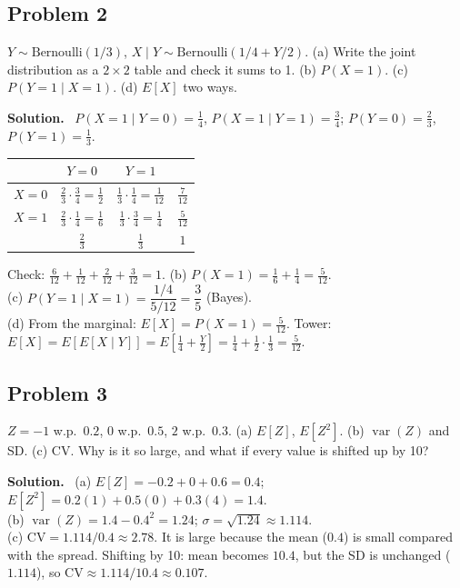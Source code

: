 \documentclass[11pt]{article}
\newcommand{\Bern}{\text{Bernoulli}}
\newenvironment{soln}{\par\smallskip\noindent\textbf{Solution.}\ }{\par\medskip}
\begin{document}
\subsection*{Problem 2}
$Y\sim\Bern(1/3)$, $X\mid Y\sim\Bern(1/4+Y/2)$. (a) Write the joint distribution as a $2\times2$ table and check it sums to 1. (b) $P(X{=}1)$. (c) $P(Y{=}1\mid X{=}1)$. (d) $E[X]$ two ways.
\begin{soln}
$P(X{=}1\mid Y{=}0)=\frac14$, $P(X{=}1\mid Y{=}1)=\frac34$; $P(Y{=}0)=\frac23$, $P(Y{=}1)=\frac13$.
\begin{center}
\begin{tabular}{c|cc|c}
 & $Y=0$ & $Y=1$ &\\\hline
$X=0$ & $\frac23\cdot\frac34=\frac12$ & $\frac13\cdot\frac14=\frac1{12}$ & $\frac7{12}$\\
$X=1$ & $\frac23\cdot\frac14=\frac16$ & $\frac13\cdot\frac34=\frac14$ & $\frac5{12}$\\\hline
 & $\frac23$ & $\frac13$ & $1$
\end{tabular}
\end{center}
Check: $\frac6{12}+\frac1{12}+\frac2{12}+\frac3{12}=1$. \quad (b) $P(X{=}1)=\frac16+\frac14=\frac5{12}$.\\
(c) $P(Y{=}1\mid X{=}1)=\dfrac{1/4}{5/12}=\dfrac35$ (Bayes).\\
(d) From the marginal: $E[X]=P(X{=}1)=\frac5{12}$. Tower: $E[X]=E[E[X\mid Y]]=E[\frac14+\frac Y2]=\frac14+\frac12\cdot\frac13=\frac5{12}$. \checkmark
\end{soln}

\subsection*{Problem 3}
$Z=-1$ w.p.\ $0.2$, $0$ w.p.\ $0.5$, $2$ w.p.\ $0.3$. (a) $E[Z]$, $E[Z^2]$. (b) $\operatorname{var}(Z)$ and SD. (c) CV. Why is it so large, and what if every value is shifted up by 10?
\begin{soln}
(a) $E[Z]=-0.2+0+0.6=0.4$; $E[Z^2]=0.2(1)+0.5(0)+0.3(4)=1.4$.\\
(b) $\operatorname{var}(Z)=1.4-0.4^2=1.24$; $\sigma=\sqrt{1.24}\approx1.114$.\\
(c) $\mathrm{CV}=1.114/0.4\approx2.78$. It is large because the mean ($0.4$) is small compared with the spread. Shifting by 10: mean becomes $10.4$, but the SD is unchanged ($1.114$), so $\mathrm{CV}\approx1.114/10.4\approx0.107$.
\end{soln}
\end{document}
